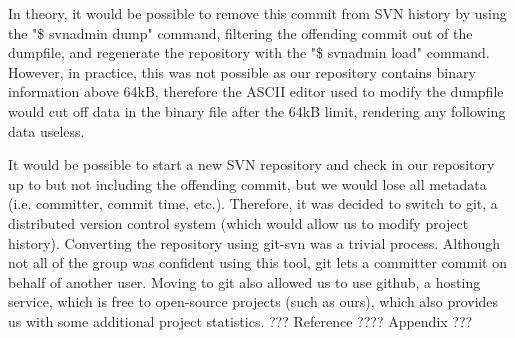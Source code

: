 In theory, it would be possible to remove this commit from SVN history by 
using the "\$ svnadmin dump" command, filtering the offending commit out of 
the dumpfile, and regenerate the repository with the "\$ svnadmin load" 
command. However, in practice, this was not possible as our repository 
contains binary information above 64kB, therefore the ASCII editor used to 
modify the dumpfile would cut off data in the binary file after the 64kB 
limit, rendering any following data useless.

It would be possible to start a new SVN repository and check in our 
repository up to but not including the offending commit, but we would lose 
all metadata (i.e. committer, commit time, etc.). Therefore, it was decided to 
switch to git, a distributed version control system (which would allow us to 
modify project history). Converting the repository using git-svn was a trivial 
process. Although not all of the group was confident using this tool, git 
lets a committer commit on behalf of another user. Moving to git also 
allowed us to use github, a hosting service, which is free to open-source 
projects (such as ours), which also provides us with some additional 
project statistics. ??? Reference ???? Appendix ???
